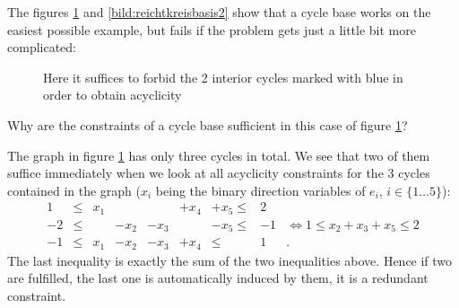 The figures \ref{bild:reichtkreisbasis1} and \ref{bild:reichtkreisbasis2}
show that a cycle base works on the easiest possible example, but fails if the problem gets just a little bit more 
complicated:

\begin{figure}[h!]
\centering
{}
\caption{Here it suffices to forbid the 2 interior cycles marked with blue in order to obtain acyclicity}
\label{bild:reichtkreisbasis1}
\end{figure}

Why are the constraints of a cycle base sufficient in this case of figure \ref{bild:reichtkreisbasis1}? 

The graph in figure \ref{bild:reichtkreisbasis1} has only three cycles in total. We see that two of them 
suffice immediately when we look at all acyclicity constraints for the 3 cycles contained in the graph 
($x_i$ being the binary direction variables of $e_i$, $i\in\{1\dots 5\}$):
\begin{align*}
 1 &\le& x_1&&&+x_4&+x_5\le& 2&\\
 -2&\le &&-x_2&-x_3&&-x_5\le& -1& \iff 1\le x_2+x_3+x_5\le 2\\
 -1 &\le &x_1&-x_2&-x_3&+x_4& \le& 1&.
\end{align*}
The last inequality is exactly the sum of the two inequalities above. Hence if two are fulfilled, the last one is 
automatically induced by them, it is a redundant constraint.

